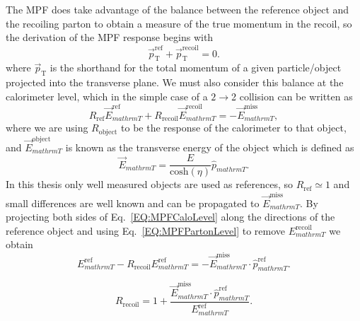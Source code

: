 The MPF does take advantage of the balance between the reference object and the recoiling parton to obtain a measure of the true momentum in the recoil, so the derivation of the MPF response begins with 
\begin{equation}
  \label{EQ:MPFPartonLevel}
  \vec{p}_{\mathrm T}^{\mathrm{ref}}+\vec{p}_{\mathrm T}^{\mathrm{recoil}} = 0.  
\end{equation}
\noindent
where $\vec{p}_{\mathrm T}$ is the shorthand for the total momentum of a given particle/object projected into the transverse plane.   
We must also consider this balance at the calorimeter level, which in the simple case of a $2\rightarrow$2 collision can be written as
\begin{equation}
  \label{EQ:MPFCaloLevel}
  R_{\mathrm{ref}}\vec{E}_{mathrm T}^{\mathrm{ref}}+R_{\mathrm{recoil}}\vec{E}_{mathrm T}^{\mathrm{recoil}}=-\vec{E}_{mathrm T}^{\mathrm{miss}},
\end{equation}
\noindent
where we are using $R_{\mathrm{object}}$ to be the response of the calorimeter to that object, and $\vec{E}_{mathrm T}^{\mathrm{object}}$ is known as the transverse energy of the object which is defined as
\begin{equation}
  \vec{E}_{mathrm T}=\frac{E}{\mathrm{cosh}\left(\eta\right)}\hat{p}_{mathrm T}.  
\end{equation}
\noindent
In this thesis only well measured objects are used as references, so $R_{\mathrm{ref}}\simeq1$ and small differences are well known and can be propagated to $\vec{E}_{mathrm T}^{\mathrm{miss}}$.  
By projecting both sides of Eq.~\ref{EQ:MPFCaloLevel} along the directions of the reference object and using Eq.~\ref{EQ:MPFPartonLevel} to remove ${E}_{mathrm T}^{\mathrm{recoil}}$ we obtain
\begin{equation}
  E_{mathrm T}^{\mathrm{ref}}-R_{\mathrm{recoil}}E_{mathrm T}^{\mathrm{ref}}=-\vec{E}_{mathrm T}^{\mathrm{miss}}\cdot\hat{p}_{mathrm T}^{\mathrm{ref}}.
\end{equation} 

\begin{equation}
  \label{EQ:MPFSimple}
  R_{\mathrm{recoil}}=1+\frac{\vec{E}_{mathrm T}^{\mathrm{miss}}\cdot\hat{p}_{mathrm T}^{\mathrm{ref}}}{E_{mathrm T}^{\mathrm{ref}}}.
\end{equation}

